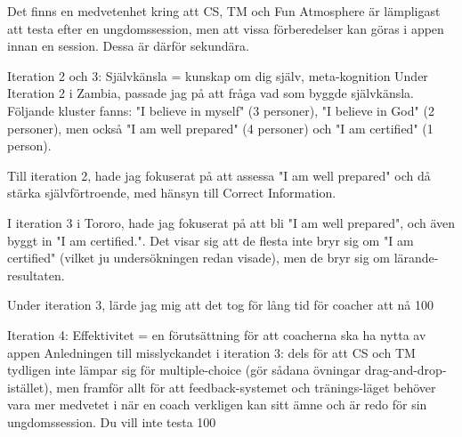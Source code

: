 Det finns en medvetenhet kring att CS, TM och Fun Atmosphere är lämpligast att testa efter en ungdomssession, men att vissa förberedelser kan göras i appen innan en session. Dessa är därför sekundära.

Iteration 2 och 3: Självkänsla = kunskap om dig själv, meta-kognition
Under Iteration 2 i Zambia, passade jag på att fråga vad som byggde självkänsla. Följande kluster fanns: "I believe in myself" (3 personer), "I believe in God" (2 personer), men också "I am well prepared" (4 personer) och "I am certified" (1 person).

Till iteration 2, hade jag fokuserat på att assessa "I am well prepared" och då stärka självförtroende, med hänsyn till Correct Information. 

I iteration 3 i Tororo, hade jag fokuserat på att bli "I am well prepared", och även byggt in "I am certified.". Det visar sig att de flesta inte bryr sig om "I am certified" (vilket ju undersökningen redan visade), men de bryr sig om lärande-resultaten.

Under iteration 3, lärde jag mig att det tog för lång tid för coacher att nå 100%

Iteration 4: Effektivitet = en förutsättning för att coacherna ska ha nytta av appen
Anledningen till misslyckandet i iteration 3: dels för att CS och TM tydligen inte lämpar sig för multiple-choice (gör sådana övningar drag-and-drop-istället), men framför allt för att feedback-systemet och tränings-läget behöver vara mer medvetet i när en coach verkligen kan sitt ämne och är redo för sin ungdomssession. Du vill inte testa 100%

